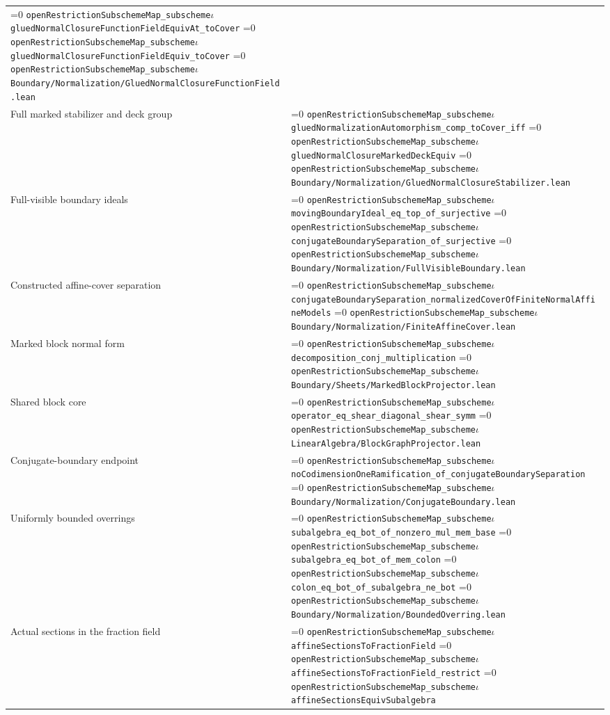 \documentclass[11pt]{article}
\theoremstyle{definition}
\theoremstyle{remark}
\newcommand{\leanpath}[1]{%
  \ifnum\pdfstrcmp{\detokenize{#1}}%
      {\detokenize{openRestrictionSubschemeMap_subschemeι}}=0
    \texttt{\nolinkurl{openRestrictionSubschemeMap_subscheme}}\ensuremath{\iota}%
  \else
    \texttt{\nolinkurl{#1}}%
  \fi}
\begin{document}
\begin{longtable}{@{}>{\raggedright\arraybackslash}p{}
                >{\raggedright\arraybackslash}p{}@{}}
\leanpath{gluedNormalClosureFunctionFieldEquivAt_toCover}\newline
\leanpath{gluedNormalClosureFunctionFieldEquiv_toCover}\newline
\leanpath{Boundary/Normalization/GluedNormalClosureFunctionField.lean}\\
Full marked stabilizer and deck group &
\leanpath{gluedNormalizationAutomorphism_comp_toCover_iff}\newline
\leanpath{gluedNormalClosureMarkedDeckEquiv}\newline
\leanpath{Boundary/Normalization/GluedNormalClosureStabilizer.lean}\\
Full-visible boundary ideals &
\leanpath{movingBoundaryIdeal_eq_top_of_surjective}\newline
\leanpath{conjugateBoundarySeparation_of_surjective}\newline
\leanpath{Boundary/Normalization/FullVisibleBoundary.lean}\\
Constructed affine-cover separation &
\leanpath{conjugateBoundarySeparation_normalizedCoverOfFiniteNormalAffineModels}\newline
\leanpath{Boundary/Normalization/FiniteAffineCover.lean}\\
Marked block normal form &
\leanpath{decomposition_conj_multiplication}\newline
\leanpath{Boundary/Sheets/MarkedBlockProjector.lean}\\
Shared block core &
\leanpath{operator_eq_shear_diagonal_shear_symm}\newline
\leanpath{LinearAlgebra/BlockGraphProjector.lean}\\
Conjugate-boundary endpoint &
\leanpath{noCodimensionOneRamification_of_conjugateBoundarySeparation}\newline
\leanpath{Boundary/Normalization/ConjugateBoundary.lean}\\
Uniformly bounded overrings &
\leanpath{subalgebra_eq_bot_of_nonzero_mul_mem_base}\newline
\leanpath{subalgebra_eq_bot_of_mem_colon}\newline
\leanpath{colon_eq_bot_of_subalgebra_ne_bot}\newline
\leanpath{Boundary/Normalization/BoundedOverring.lean}\\
Actual sections in the fraction field &
\leanpath{affineSectionsToFractionField}\newline
\leanpath{affineSectionsToFractionField_restrict}\newline
\leanpath{affineSectionsEquivSubalgebra}\newline

\end{longtable}
\end{document}
